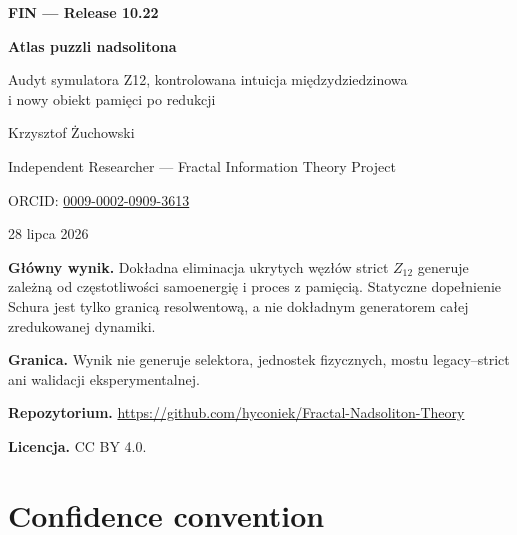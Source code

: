 \documentclass[11pt,a4paper,openany]{report}
\begin{document}
\hypersetup{pageanchor=false}
\begin{titlepage}
\centering
\vspace*{12mm}
{\Large\bfseries FIN --- Release 10.22\par}
\vspace{12mm}
{\Huge\bfseries Atlas puzzli nadsolitona\par}
\vspace{6mm}
{\Large Audyt symulatora Z12, kontrolowana intuicja międzydziedzinowa\\
i nowy obiekt pamięci po redukcji\par}
\vspace{18mm}
{\Large Krzysztof \.Zuchowski\par}
\vspace{2mm}
{\normalsize Independent Researcher --- Fractal Information Theory Project\par}
\vspace{2mm}
{\normalsize ORCID: \href{https://orcid.org/0009-0002-0909-3613}{0009-0002-0909-3613}\par}
\vspace{10mm}
{\large 28 lipca 2026\par}
\vfill
\begin{minipage}{0.89\textwidth}
\small
\textbf{Główny wynik.} Dokładna eliminacja ukrytych węzłów strict \(Z_{12}\)
generuje zależną od częstotliwości samoenergię i proces z pamięcią.
Statyczne dopełnienie Schura jest tylko granicą resolwentową, a nie dokładnym
generatorem całej zredukowanej dynamiki.

\medskip
\textbf{Granica.} Wynik nie generuje selektora, jednostek fizycznych,
mostu legacy--strict ani walidacji eksperymentalnej.

\medskip
\textbf{Repozytorium.}
\url{https://github.com/hyconiek/Fractal-Nadsoliton-Theory}

\textbf{Licencja.} CC BY 4.0.
\end{minipage}
\vfill
\end{titlepage}
\hypersetup{pageanchor=true}
\tableofcontents
\clearpage
{}

\chapter*{Confidence convention}
\end{document}
